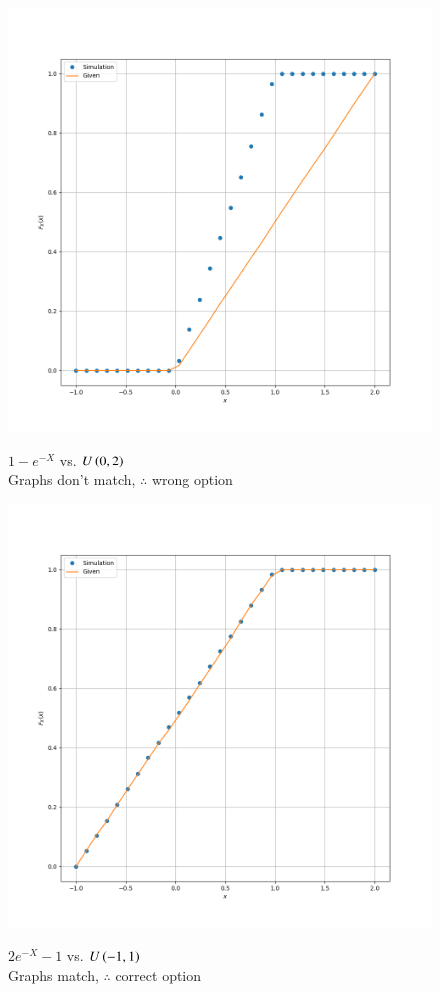 \documentclass[book,11pt]{IEEEtran}
\begin{document}
\begin{figure}[H]
	\centering
	\includegraphics[width=\columnwidth]{2023/ST/53/figs/cdf_comp_2.png}
	\label{fig:i_2023/st/53/2}
	\caption{$1-e^{-X}$ vs. $U\left(0,2\right)$\\Graphs don't match, $\therefore$ wrong option}
\end{figure}
\begin{figure}[H]
	\centering
	\includegraphics[width=\columnwidth]{2023/ST/53/figs/cdf_comp_3.png}
	\label{fig:i_2023/st/53/3}
	\caption{$2e^{-X}-1$ vs. $U\left(-1,1\right)$\\Graphs match, $\therefore$ correct option}
\end{figure}
\end{document}
